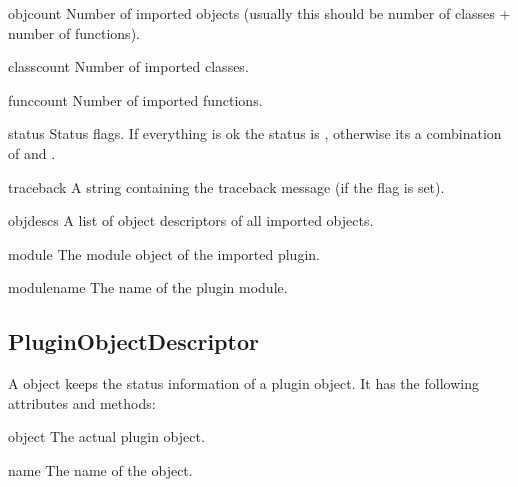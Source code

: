 \begin{datadesc}{objcount}
Number of imported objects (usually this should be number of classes + 
number of functions).
\end{datadesc}

\begin{datadesc}{classcount}
Number of imported classes.
\end{datadesc}

\begin{datadesc}{funccount}
Number of imported functions.
\end{datadesc}

\begin{datadesc}{status}
Status flags. If everything is ok the status is , otherwise
its a combination of  and .
\end{datadesc}

\begin{datadesc}{traceback}
A string containing the traceback message (if the 
flag is set).
\end{datadesc}

\begin{datadesc}{objdescs}
A list of object descriptors of all imported objects.
\end{datadesc}

\begin{datadesc}{module}
The module object of the imported plugin.
\end{datadesc}

\begin{datadesc}{modulename}
The name of the plugin module.
\end{datadesc}

\subsection{PluginObjectDescriptor}

A  object keeps the status information
of a plugin object. It has the following attributes and methods:

\begin{datadesc}{object}
The actual plugin object.
\end{datadesc}

\begin{datadesc}{name}
The name of the object.
\end{datadesc}

